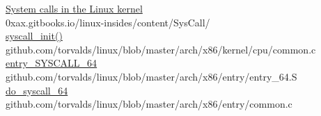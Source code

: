 \documentclass[journal, a4paper]{IEEEtran}
\begin{document}
\begin{thebibliography}{}
	\href{https://0xax.gitbooks.io/linux-insides/content/SysCall/}{System calls in the Linux kernel}\\
	0xax.gitbooks.io/linux-insides/content/SysCall/\\

	\href{https://github.com/torvalds/linux/blob/master/arch/x86/kernel/cpu/common.c}{syscall\_init()}\\
	github.com/torvalds/linux/blob/master/arch/x86/kernel/cpu/common.c\\

	\href{https://github.com/torvalds/linux/blob/master/arch/x86/entry/entry_64.S}{entry\_SYSCALL\_64}\\
	github.com/torvalds/linux/blob/master/arch/x86/entry/entry\_64.S\\

	\href{https://github.com/torvalds/linux/blob/master/arch/x86/entry/common.c}{do\_syscall\_64}\\
	github.com/torvalds/linux/blob/master/arch/x86/entry/common.c\\
\end{thebibliography}
\end{document}
